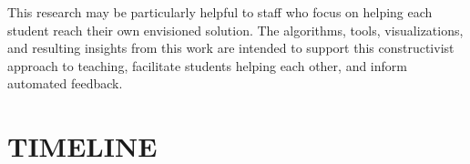 \documentclass[12pt]{article}
\begin{document}

This research may be particularly helpful to staff who focus on helping each student reach their own envisioned solution. The algorithms, tools, visualizations, and resulting insights from this work are intended to support this constructivist approach to teaching, facilitate students helping each other, and inform automated feedback.

\section{TIMELINE}
\end{document}
